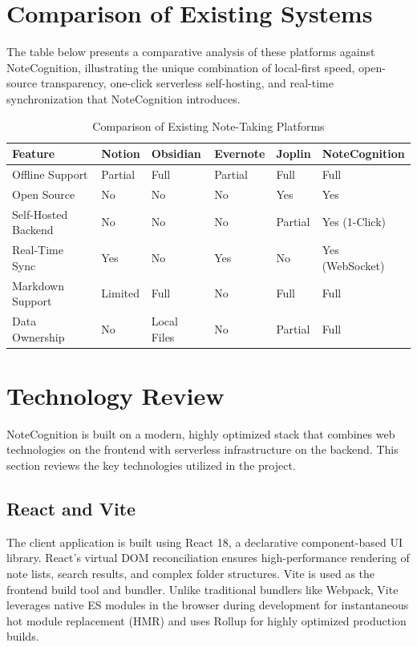 \documentclass[12pt, a4paper, oneside]{report}
\begin{document}
\section{Comparison of Existing Systems}

The table below presents a comparative analysis of these platforms against NoteCognition, illustrating the unique combination of local-first speed, open-source transparency, one-click serverless self-hosting, and real-time synchronization that NoteCognition introduces.

\begin{table}[H]
\centering
\caption{Comparison of Existing Note-Taking Platforms}
\label{tab:comparison}
\begin{tabularx}{\textwidth}{|l|X|X|X|X|X|}
\hline
\textbf{Feature} & \textbf{Notion} & \textbf{Obsidian} & \textbf{Evernote} & \textbf{Joplin} & \textbf{NoteCognition} \\
\hline
Offline Support & Partial & Full & Partial & Full & Full \\
\hline
Open Source & No & No & No & Yes & Yes \\
\hline
Self-Hosted Backend & No & No & No & Partial & Yes (1-Click) \\
\hline
Real-Time Sync & Yes & No & Yes & No & Yes (WebSocket) \\
\hline
Markdown Support & Limited & Full & No & Full & Full \\
\hline
Data Ownership & No & Local Files & No & Partial & Full \\
\hline
\end{tabularx}
\end{table}

\section{Technology Review}

NoteCognition is built on a modern, highly optimized stack that combines web technologies on the frontend with serverless infrastructure on the backend. This section reviews the key technologies utilized in the project.

\subsection{React and Vite}
The client application is built using React 18, a declarative component-based UI library. React's virtual DOM reconciliation ensures high-performance rendering of note lists, search results, and complex folder structures. Vite is used as the frontend build tool and bundler. Unlike traditional bundlers like Webpack, Vite leverages native ES modules in the browser during development for instantaneous hot module replacement (HMR) and uses Rollup for highly optimized production builds.
\end{document}
